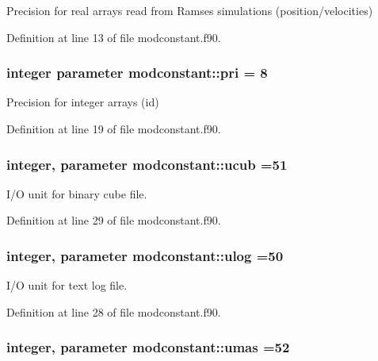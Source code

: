 Precision for real arrays read from Ramses simulations (position/velocities) 



Definition at line 13 of file modconstant.\-f90.

\hypertarget{classmodconstant_a3463d55217ae4b194f21c061a619c48e}{
\subsubsection[{pri}]{\setlength{\rightskip}{0pt plus 5cm}integer parameter modconstant\-::pri = 8}}\label{classmodconstant_a3463d55217ae4b194f21c061a619c48e}


Precision for integer arrays (id) 



Definition at line 19 of file modconstant.\-f90.

\hypertarget{classmodconstant_acb8d6ab8e571b34dcb11638e425e57db}{
\subsubsection[{ucub}]{\setlength{\rightskip}{0pt plus 5cm}integer, parameter modconstant\-::ucub =51}}\label{classmodconstant_acb8d6ab8e571b34dcb11638e425e57db}


I/\-O unit for binary cube file. 



Definition at line 29 of file modconstant.\-f90.

\hypertarget{classmodconstant_a6921eef21b749faf744304003fa3ac63}{
\subsubsection[{ulog}]{\setlength{\rightskip}{0pt plus 5cm}integer, parameter modconstant\-::ulog =50}}\label{classmodconstant_a6921eef21b749faf744304003fa3ac63}


I/\-O unit for text log file. 



Definition at line 28 of file modconstant.\-f90.

\hypertarget{classmodconstant_a542f50ea5e4225b1340cbcbca9eb30ee}{
\subsubsection[{umas}]{\setlength{\rightskip}{0pt plus 5cm}integer, parameter modconstant\-::umas =52}}\label{classmodconstant_a542f50ea5e4225b1340cbcbca9eb30ee}


